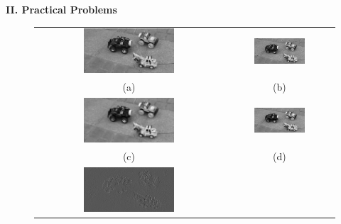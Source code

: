 \documentclass[11pt]{article}
\begin{document}

{\huge{\bf II. Practical Problems}}

\begin{figure}[!hbt]
\centering
\begin{tabular}{cc}
  \includegraphics[width=0.5\textwidth]{../toy-car-images-bw/toy_formatted2.png} &
  \includegraphics[width=0.5\textwidth]{../toy-car-images-bw/toy_formatted9.png} \\
  (a) & (b) \\
  \includegraphics[width=0.5\textwidth]{../im2_smooth.png} &
    \includegraphics[width=0.5\textwidth]{../im9_smooth.png} \\
  (c) & (d) \\
  \includegraphics[width=0.5\textwidth]{../Ex2-9.png} &

\end{tabular}
\end{figure}
\end{document}

